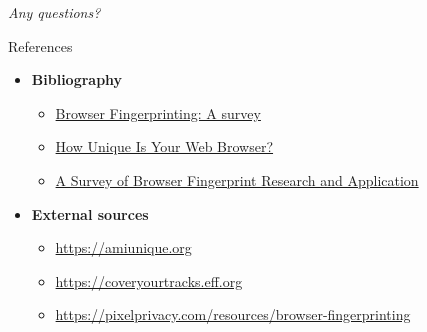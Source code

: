 \begin{frame}
  \centering \Huge \emph{Any questions?}
\end{frame}

\begin{frame}{References}
  \begin{itemize}
    \item \textbf{Bibliography}
    \begin{itemize}
      \item \href{https://arxiv.org/pdf/1905.01051.pdf}{Browser Fingerprinting: A survey}
      \item \href{https://coveryourtracks.eff.org/static/browser-uniqueness.pdf}{How Unique Is Your Web Browser?}
      \item \href{https://downloads.hindawi.com/journals/wcmc/2022/3363335.pdf}{A Survey of Browser Fingerprint Research and Application}
    \end{itemize}
    \item \textbf{External sources}
    \begin{itemize}
      \item \href{https://amiunique.org/faq}{https://amiunique.org}
      \item \href{https://coveryourtracks.eff.org/about}{https://coveryourtracks.eff.org}
      \item \href{https://pixelprivacy.com/resources/browser-fingerprinting}{https://pixelprivacy.com/resources/browser-fingerprinting}
    \end{itemize}
  \end{itemize}
\end{frame}


